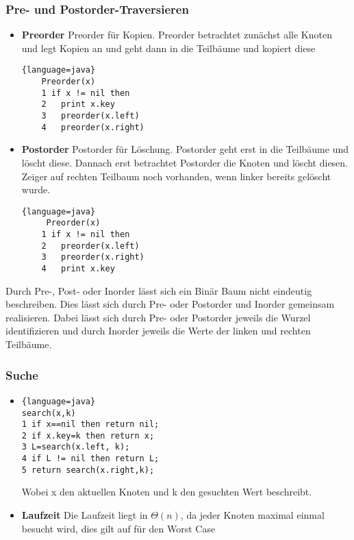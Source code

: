 \documentclass[jou,apacite]{apa6}
\begin{document}
\subsubsection{Pre- und Postorder-Traversieren}
\begin{itemize}
    \item {\bfseries Preorder}
    Preorder für Kopien. Preorder betrachtet zunächst alle Knoten und legt Kopien an und geht dann in die Teilbäume und kopiert diese
    \begin{lstlisting}{language=java}
    Preorder(x)
    1 if x != nil then
    2   print x.key
    3   preorder(x.left)
    4   preorder(x.right)
    \end{lstlisting}
    \item {\bfseries Postorder}
    Postorder für Löschung. Postorder geht erst in die Teilbäume und löscht diese. Dannach erst betrachtet Postorder die Knoten und löscht diesen. Zeiger auf rechten Teilbaum noch vorhanden, wenn linker bereits gelöscht wurde.
    \begin{lstlisting}{language=java}
     Preorder(x)
    1 if x != nil then
    2   preorder(x.left)
    3   preorder(x.right)
    4   print x.key
    \end{lstlisting}
    
\end{itemize}
    Durch Pre-, Post- oder Inorder lässt sich ein Binär Baum nicht eindeutig beschreiben. Dies lässt sich durch Pre- oder Postorder und Inorder gemeinsam realisieren. Dabei lässt sich durch Pre- oder Postorder jeweils die Wurzel identifizieren und durch Inorder jeweils die Werte der linken und rechten Teilbäume.
    
    \subsubsection{Suche}
    \begin{itemize}
        \item 
        \begin{lstlisting}{language=java}
search(x,k)
1 if x==nil then return nil;
2 if x.key=k then return x;
3 L=search(x.left, k);
4 if L != nil then return L;
5 return search(x.right,k);
        \end{lstlisting}
        Wobei x den aktuellen Knoten und k den gesuchten Wert beschreibt.
        \item {\bfseries Laufzeit} Die Laufzeit liegt in $\Theta(n)$, da jeder Knoten maximal einmal besucht wird, dies gilt auf für den Worst Case 
    \end{itemize}
\end{document}
